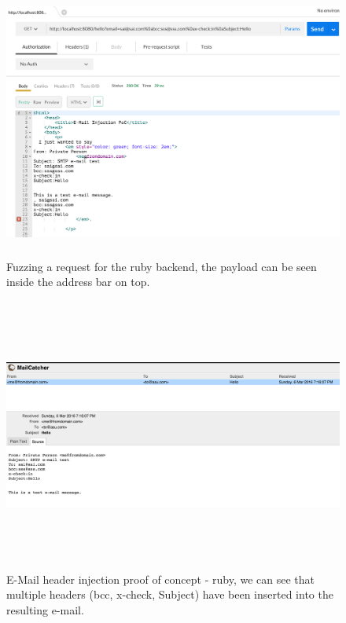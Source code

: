 \begin{figure}[!htbp]
	\centering
	\includegraphics[width=14cm, height=9cm]{System/EMI_Postman_Ruby}
	\caption{Fuzzing a request for the ruby backend, the payload can be seen inside the address bar on top.}
	\label{fig:postmanruby}
\end{figure}

\begin{figure}[!htbp]
	\centering
	\includegraphics[width=14cm, height=9cm]{System/EMI_Mailcatcher_Ruby}
	\caption{E-Mail header injection proof of concept - ruby, we can see that multiple headers (bcc, x-check, Subject) have been inserted into the resulting e-mail.}
	\label{fig:mailcatcherruby}
\end{figure}

